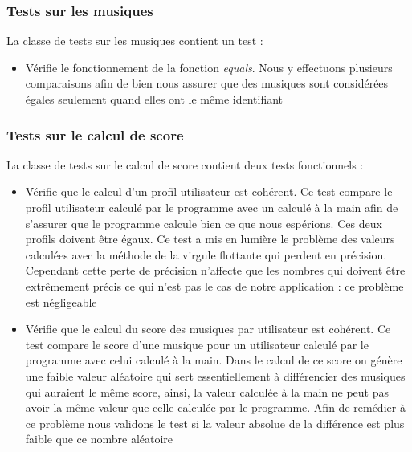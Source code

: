 \documentclass{article}
\begin{document}
        \subsubsection{Tests sur les musiques}
         La classe de tests sur les musiques contient un test : 
         \begin{itemize}
             \item Vérifie le fonctionnement de la fonction \textit{equals}. Nous y effectuons plusieurs comparaisons afin de bien nous assurer que des musiques sont considérées égales seulement quand elles ont le même identifiant
         \end{itemize}

        \subsubsection{Tests sur le calcul de score}
        La classe de tests sur le calcul de score contient deux tests fonctionnels : 
        \begin{itemize}
            \item Vérifie que le calcul d'un profil utilisateur est cohérent. Ce test compare le profil utilisateur calculé par le programme avec un calculé à la main afin de s'assurer que le programme calcule bien ce que nous espérions. Ces deux profils doivent être égaux. Ce test a mis en lumière le problème des valeurs calculées avec la méthode de la virgule flottante qui perdent en précision. Cependant cette perte de précision n'affecte que les nombres qui doivent être extrêmement précis ce qui n'est pas le cas de notre application : ce problème est négligeable
            \item Vérifie que le calcul du score des musiques par utilisateur est cohérent. Ce test compare le score d'une musique pour un utilisateur calculé par le programme avec celui calculé à la main. Dans le calcul de ce score on génère une faible valeur aléatoire qui sert essentiellement à différencier des musiques qui auraient le même score, ainsi, la valeur calculée à la main ne peut pas avoir la même valeur que celle calculée par le programme. Afin de remédier à ce problème nous validons le test si la valeur absolue de la différence est plus faible que ce nombre aléatoire
        \end{itemize}
\end{document}
